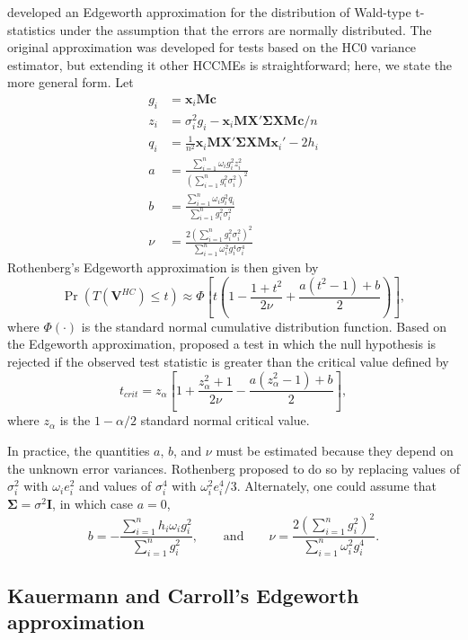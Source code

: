 \documentclass[12pt]{article}\usepackage[]{graphicx}\usepackage[]{color}
\newcommand{\bm}{\mathbf}
\newcommand{\bs}{\boldsymbol}
\begin{document}
\citet{Rothenberg1988approximate} developed an Edgeworth approximation for the distribution of Wald-type t-statistics under the assumption that the errors are normally distributed. The original approximation was developed for tests based on the HC0 variance estimator, but extending it other HCCMEs is straightforward; here, we state the more general form. 
Let
\begin{align*}
g_i &= \bm{x}_i\bm{M}\bm{c} \\
z_i &= \sigma_i^2 g_i - \bm{x}_i \bm{M}\bm{X}'\bs\Sigma \bm{X} \bm{M}\bm{c} / n \\ 
q_i &= \frac{1}{n^2} \bm{x}_i\bm{M}\bm{X}'\bs\Sigma \bm{X}\bm{M}\bm{x}_i'  - 2 h_i \\
a &= \frac{\sum_{i=1}^n \omega_i g_i^2 z_i^2}{\left(\sum_{i=1}^n g_i^2 \sigma_i^2\right)^2} \\
b &= \frac{\sum_{i=1}^n \omega_i g_i^2  q_i}{\sum_{i=1}^n g_i^2 \sigma_i^2} \\
\nu &= \frac{2\left(\sum_{i=1}^n g_i^2 \sigma_i^2\right)^2}{\sum_{i=1}^n \omega_i^2 g_i^4 \sigma_i^4}
\end{align*}
Rothenberg's Edgeworth approximation is then given by 
\[
\Pr\left(T(\bm{V}^{HC}) \leq t \right) \approx \Phi\left[t \left(1 - \frac{1 + t^2}{2\nu} + \frac{a\left(t^2 - 1\right) + b}{2}\right)\right], 
\]
where $\Phi(\cdot)$ is the standard normal cumulative distribution function.
Based on the Edgeworth approximation, \citet{Rothenberg1988approximate} proposed a test in which the null hypothesis is rejected if the observed test statistic is greater than the critical value defined by 
\begin{equation}
\label{eq:edge_Roth}
t_{crit} = z_{\alpha}\left[1 + \frac{z_{\alpha}^2 + 1}{2 \nu} - \frac{a\left(z_{\alpha}^2 - 1\right) + b}{2}\right],
\end{equation}
where $z_\alpha$ is the $1 - \alpha / 2$ standard normal critical value. 

In practice, the quantities $a$, $b$, and $\nu$ must be estimated because they depend on the unknown error variances. 
Rothenberg proposed to do so by replacing values of $\sigma_i^2$ with $\omega_i e_i^2$ and values of $\sigma_i^4$ with $\omega_i^2 e_i^4 / 3$. 
Alternately, one could assume that $\bs\Sigma = \sigma^2 \bm{I}$, in which case $a = 0$, 
\[
b = - \frac{\sum_{i=1}^n h_i \omega_i g_i^2}{\sum_{i=1}^n g_i^2}, \qquad \text{and} \qquad 
\nu = \frac{2\left(\sum_{i=1}^n g_i^2 \right)^2}{\sum_{i=1}^n \omega_i^2 g_i^4}.
\]

\subsection{Kauermann and Carroll's Edgeworth approximation}
\end{document}

